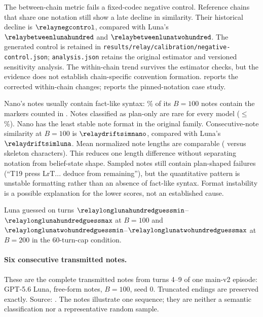 The between-chain metric fails a fixed-codec negative control. Reference chains that share one notation still show a late decline in similarity. Their historical decline is $\relaynegcontrol$, compared with Luna's $\relaybetweenlunahundred$ and $\relaybetweenlunatwohundred$. The generated control is retained in \texttt{results/relay/calibration/negative-control.json}; \texttt{analysis.json} retains the original estimator and versioned sensitivity analysis. The within-chain trend survives the estimator checks, but the evidence does not establish chain-specific convention formation.  reports the corrected within-chain changes;  reports the pinned-notation case study.

Nano's notes usually contain fact-like syntax: \relaystatepctnano\% of its $B{=}100$ notes contain the markers counted in . Notes classified as plan-only are rare for every model ($\leq$\relayplanpctmax\%). Nano has the least stable note format in the original family. Consecutive-note similarity at $B{=}100$ is $\relaydriftsimnano$, compared with Luna's $\relaydriftsimluna$. Mean normalized note lengths are comparable (\relaydriftlennano{} versus \relaydriftlenluna{} skeleton characters). This reduces one length difference without separating notation from belief-state shape. Sampled notes still contain plan-shaped failures (``T19 press LrT... deduce from remaining''), but the quantitative pattern is unstable formatting rather than an absence of fact-like syntax. Format instability is a possible explanation for the lower scores, not an established cause.

Luna guessed on turns $\relaylonglunahundredguessmin$--$\relaylonglunahundredguessmax$ at $B{=}100$ and $\relaylonglunatwohundredguessmin$--$\relaylonglunatwohundredguessmax$ at $B{=}200$ in the 60-turn-cap condition.

\noindent\begin{minipage}{\linewidth}
\paragraph{Six consecutive transmitted notes.}
These are the complete transmitted notes from turns 4--9 of one main-v2 episode: GPT-5.6 Luna, free-form notes, $B{=}100$, seed 0. Truncated endings are preserved exactly. Source: . The notes illustrate one sequence; they are neither a semantic classification nor a representative random sample.

\end{minipage}

